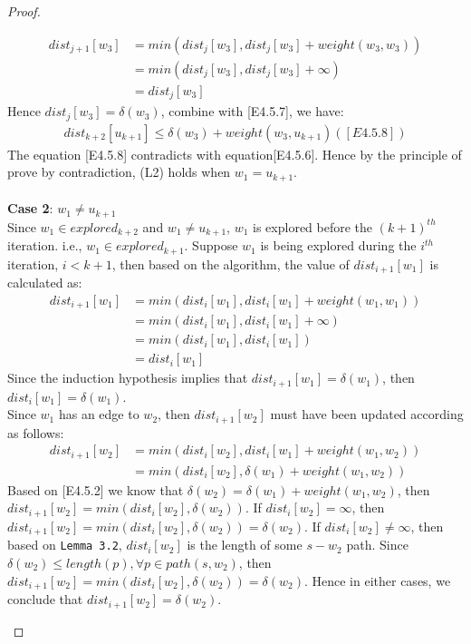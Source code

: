 \begin{proof}
\begin{itemize}
\begin{enumerate}
\begin{align*}
    dist_{j+1}[w_3] &= min(dist_j[w_3], dist_j[w_3] + weight(w_3, w_3)) \\
                   &= min(dist_j[w_3], dist_j[w_3] + \infty) \\
                   &= dist_j[w_3]
  \end{align*}
  Hence $dist_j[w_3] = \delta(w_3)$, combine with [E4.5.7], we have: 
  \begin{align*}
    dist_{k+2}[u_{k+1}] \leq \delta(w_3) + weight(w_3, u_{k+1}) ([E4.5.8])
  \end{align*}
  The equation [E4.5.8] contradicts with equation[E4.5.6]. Hence by the principle of prove by contradiction, (L2) holds when $w_1 = u_{k+1}$. 
  \\\\

  \textbf{Case 2}: $w_1 \neq u_{k+1}$
  \\ 
  Since $w_1 \in explored_{k+2}$ and $w_1 \neq u_{k+1}$, $w_1$ is explored before the $(k+1)^{th}$ iteration. i.e., $w_1 \in explored_{k+1}$. Suppose $w_1$ is being explored during the $i^{th}$ iteration, $i < k+1$, then based on the algorithm, the value of $dist_{i+1}[w_1]$ is calculated as: 
  \begin{align*}
        dist_{i+1}[w_1] &= min(dist_{i}[w_1], dist_{i}[w_1] + weight(w_1,w_1)) \\
                        &= min(dist_{i}[w_1], dist_{i}[w_1] + \infty)\\
                        &= min(dist_{i}[w_1], dist_{i}[w_1])\\
                        &= dist_{i}[w_1]
  \end{align*}
  Since the induction hypothesis implies that $dist_{i+1}[w_1] = \delta(w_1)$, then $dist_i[w_1] = \delta(w_1)$. 
  \\
  Since $w_1$ has an edge to $w_2$, then $dist_{i+1}[w_2]$ must have been updated according as follows: 
  \begin{align*}
     dist_{i+1}[w_2] &= min(dist_i[w_2], dist_i[w_1] + weight(w_1,w_2)) \\
                     &= min(dist_i[w_2], \delta(w_1) + weight(w_1, w_2))
  \end{align*}
  Based on [E4.5.2] we know that $\delta(w_2) =  \delta(w_1) + weight(w_1, w_2)$, then $dist_{i+1}[w_2] = min(dist_i[w_2], \delta(w_2))$. If $dist_i[w_2] = \infty$, then $dist_{i+1}[w_2] = min(dist_i[w_2], \delta(w_2)) = \delta(w_2)$. If $dist_i[w_2] \neq \infty$, then based on \texttt{Lemma 3.2}, $dist_i[w_2]$ is the length of some $s-w_2$ path. Since $\delta(w_2) \leq length(p), \forall p \in path(s, w_2)$, then $dist_{i+1}[w_2] = min(dist_i[w_2], \delta(w_2)) = \delta(w_2)$. Hence in either cases, we conclude that $dist_{i+1}[w_2] = \delta(w_2)$. 

\end{enumerate}
\end{itemize}
\end{proof}
